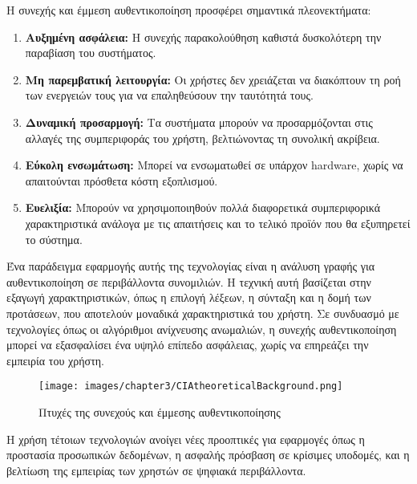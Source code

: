 Η συνεχής και έμμεση αυθεντικοποίηση προσφέρει σημαντικά πλεονεκτήματα:
\begin{enumerate}
    \item \textbf{Αυξημένη ασφάλεια:} Η συνεχής παρακολούθηση καθιστά δυσκολότερη την παραβίαση του συστήματος.
    \item \textbf{Μη παρεμβατική λειτουργία:} Οι χρήστες δεν χρειάζεται να διακόπτουν τη ροή των ενεργειών τους για να επαληθεύσουν την ταυτότητά τους.
    \item \textbf{Δυναμική προσαρμογή:} Τα συστήματα μπορούν να προσαρμόζονται στις αλλαγές της συμπεριφοράς του χρήστη, βελτιώνοντας τη συνολική ακρίβεια.
    \item \textbf{Εύκολη ενσωμάτωση:} Μπορεί να ενσωματωθεί σε υπάρχον hardware, χωρίς να απαιτούνται πρόσθετα κόστη εξοπλισμού.
    \item \textbf{Ευελιξία:} Μπορούν να χρησιμοποιηθούν πολλά διαφορετικά συμπεριφορικά χαρακτηριστικά ανάλογα με τις απαιτήσεις και το τελικό προϊόν που θα εξυπηρετεί το σύστημα. 
\end{enumerate}

Ένα παράδειγμα εφαρμογής αυτής της τεχνολογίας είναι η ανάλυση γραφής για αυθεντικοποίηση σε περιβάλλοντα συνομιλιών. Η τεχνική αυτή βασίζεται στην εξαγωγή χαρακτηριστικών, όπως η επιλογή λέξεων, η σύνταξη και η δομή των προτάσεων, που αποτελούν μοναδικά χαρακτηριστικά του χρήστη. Σε συνδυασμό με τεχνολογίες όπως οι αλγόριθμοι ανίχνευσης ανωμαλιών, η συνεχής αυθεντικοποίηση μπορεί να εξασφαλίσει ένα υψηλό επίπεδο ασφάλειας, χωρίς να επηρεάζει την εμπειρία του χρήστη.

\begin{figure}[H]
    \centering
    \texttt{[image: images/chapter3/CIAtheoreticalBackground.png]}
    \caption{Πτυχές της συνεχούς και έμμεσης αυθεντικοποίησης}
    \label{fig:chapter3_CIA}
\end{figure}

Η χρήση τέτοιων τεχνολογιών ανοίγει νέες προοπτικές για εφαρμογές όπως η προστασία προσωπικών δεδομένων, η ασφαλής πρόσβαση σε κρίσιμες υποδομές, και η βελτίωση της εμπειρίας των χρηστών σε ψηφιακά περιβάλλοντα.
